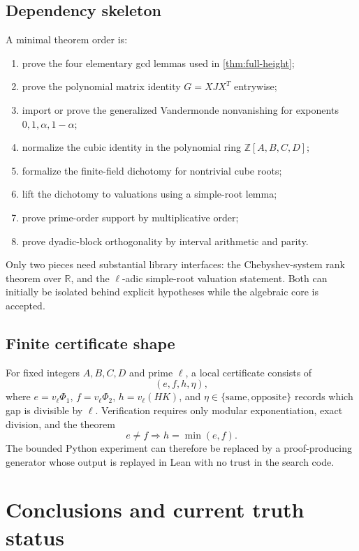 \documentclass[11pt]{article}
\theoremstyle{definition}
\theoremstyle{remark}
\newcommand{\Z}{\mathbb{Z}}
\newcommand{\R}{\mathbb{R}}
\begin{document}
\subsection{Dependency skeleton}

A minimal theorem order is:
\begin{enumerate}
\item prove the four elementary gcd lemmas used in \cref{thm:full-height};
\item prove the polynomial matrix identity $G=XJX^T$ entrywise;
\item import or prove the generalized Vandermonde nonvanishing for exponents $0,1,\alpha,1-\alpha$;
\item normalize the cubic identity in the polynomial ring $\Z[A,B,C,D]$;
\item formalize the finite-field dichotomy for nontrivial cube roots;
\item lift the dichotomy to valuations using a simple-root lemma;
\item prove prime-order support by multiplicative order;
\item prove dyadic-block orthogonality by interval arithmetic and parity.
\end{enumerate}

Only two pieces need substantial library interfaces: the Chebyshev-system rank theorem over $\R$, and the $\ell$-adic simple-root valuation statement.  Both can initially be isolated behind explicit hypotheses while the algebraic core is accepted.

\subsection{Finite certificate shape}

For fixed integers $A,B,C,D$ and prime $\ell$, a local certificate consists of
\begin{equation}\label{eq:certificate-shape}
 (e,f,h,\eta),
\end{equation}
where $e=v_\ell\Phi_1$, $f=v_\ell\Phi_2$, $h=v_\ell(HK)$, and $\eta\in\{\text{same},\text{opposite}\}$ records which gap is divisible by $\ell$.  Verification requires only modular exponentiation, exact division, and the theorem
\[
 e\ne f\Longrightarrow h=\min(e,f).
\]
The bounded Python experiment can therefore be replaced by a proof-producing generator whose output is replayed in Lean with no trust in the search code.

\section{Conclusions and current truth status}
\label{sec:conclusion}
\end{document}
